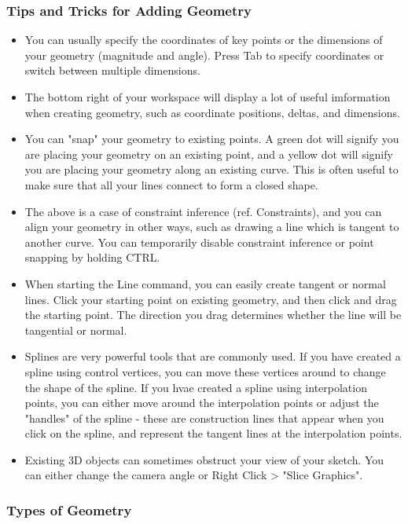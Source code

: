 \subsubsection{Tips and Tricks for Adding Geometry}
\begin{itemize}
    \item You can usually specify the coordinates of key points or the dimensions of your geometry (magnitude and angle). Press Tab to specify coordinates or switch between multiple dimensions.
    \item The bottom right of your workspace will display a lot of useful imformation when creating geometry, such as coordinate positions, deltas, and dimensions.
    \item You can "snap" your geometry to existing points. A green dot will signify you are placing your geometry on an existing point, and a yellow dot will signify you are placing your geometry along an existing curve. This is often useful to make sure that all your lines connect to form a closed shape.
    \item The above is a case of constraint inference (ref. Constraints), and you can align your geometry in other ways, such as drawing a line which is tangent to another curve. You can temporarily disable constraint inference or point snapping by holding CTRL.
    \item When starting the Line command, you can easily create tangent or normal lines. Click your starting point on existing geometry, and then click and drag the starting point. The direction you drag determines whether the line will be tangential or normal.
    \item Splines are very powerful tools that are commonly used. If you have created a spline using control vertices, you can move these vertices around to change the shape of the spline. If you hvae created a spline using interpolation points, you can either move around the interpolation points or adjust the "handles" of the spline - these are construction lines that appear when you click on the spline, and represent the tangent lines at the interpolation points.
    \item Existing 3D objects can sometimes obstruct your view of your sketch. You can either change the camera angle or Right Click > "Slice Graphics".
\end{itemize}

\subsubsection{Types of Geometry}

